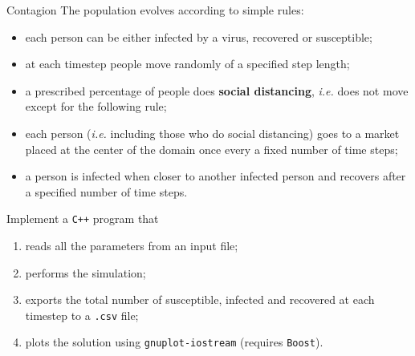 \documentclass[10pt]{beamer}
\begin{document}
\begin{frame}{Contagion}
The population evolves according to simple rules:

\begin{itemize}
    \item each person can be either infected by a virus, recovered or susceptible;
    \item at each timestep people move randomly of a specified step length;
    \item a prescribed percentage of people does \textbf{social distancing}, \textit{i.e.} does not move except for the following rule;
    \item each person (\textit{i.e.} including those who do social distancing) goes to a market placed at the center of the domain once every a fixed number of time steps;
    \item a person is infected when closer to another infected person and recovers after a specified number of time steps.
\end{itemize}
\pause
Implement a \texttt{C++} program that
\begin{enumerate}
    \item reads all the parameters from an input file;
    \item performs the simulation;
    \item exports the total number of susceptible, infected and recovered at each timestep to a \texttt{.csv} file;
    \item plots the solution using \texttt{gnuplot-iostream} (requires \texttt{Boost}).
\end{enumerate}
\end{frame}
\end{document}
